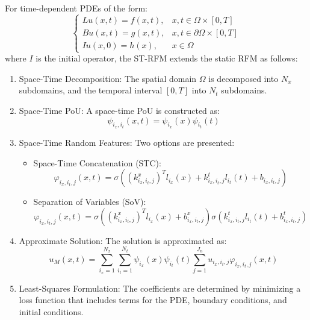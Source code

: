 \documentclass[11pt]{article}
\begin{document}
For time-dependent PDEs of the form:
\begin{equation}
\begin{cases}
Lu(x,t) = f(x,t), & x,t \in \Omega \times [0,T] \\
Bu(x,t) = g(x,t), & x,t \in \partial\Omega \times [0,T] \\
Iu(x,0) = h(x), & x \in \Omega
\end{cases}
\end{equation}
where $I$ is the initial operator, the ST-RFM extends the static RFM as follows:

\begin{enumerate}
    \item Space-Time Decomposition: The spatial domain $\Omega$ is decomposed into $N_x$ subdomains, and the temporal interval $[0,T]$ into $N_t$ subdomains.
    
    \item Space-Time PoU: A space-time PoU is constructed as:
    \begin{equation}
        \psi_{i_x,i_t}(x,t) = \psi_{i_x}(x) \psi_{i_t}(t)
    \end{equation}
    
    \item Space-Time Random Features: Two options are presented:
    \begin{itemize}
        \item Space-Time Concatenation (STC):
        \begin{equation}
            \varphi_{i_x,i_t,j}(x,t) = \sigma((k^x_{i_x,i_t,j})^T l_{i_x}(x) + k^t_{i_x,i_t,j} l_{i_t}(t) + b_{i_x,i_t,j})
        \end{equation}
        
        \item Separation of Variables (SoV):
        \begin{equation}
            \varphi_{i_x,i_t,j}(x,t) = \sigma((k^x_{i_x,i_t,j})^T l_{i_x}(x) + b^x_{i_x,i_t,j}) \sigma(k^t_{i_x,i_t,j} l_{i_t}(t) + b^t_{i_x,i_t,j})
        \end{equation}
    \end{itemize}
    
    \item Approximate Solution: The solution is approximated as:
    \begin{equation}
        u_M(x,t) = \sum_{i_x=1}^{N_x} \sum_{i_t=1}^{N_t} \psi_{i_x}(x) \psi_{i_t}(t) \sum_{j=1}^{J_n} u_{i_x,i_t,j} \varphi_{i_x,i_t,j}(x,t)
    \end{equation}
    
    \item Least-Squares Formulation: The coefficients are determined by minimizing a loss function that includes terms for the PDE, boundary conditions, and initial conditions.
\end{enumerate}
\end{document}
